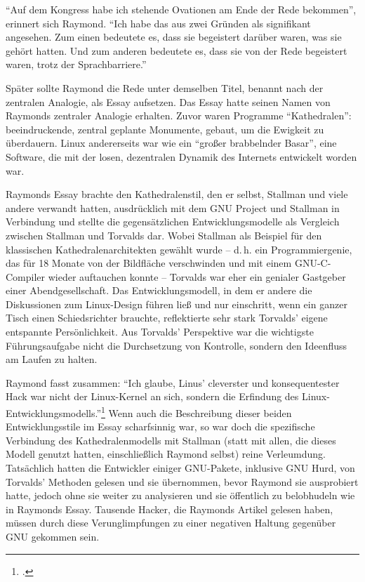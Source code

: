 "`Auf dem Kongress habe ich stehende Ovationen am Ende der Rede bekommen"', erinnert sich Raymond. "`Ich habe das aus zwei Gründen als signifikant angesehen. Zum einen bedeutete es, dass sie begeistert darüber waren, was sie gehört hatten. Und zum anderen bedeutete es, dass sie von der Rede begeistert waren, trotz der Sprachbarriere."'

Später sollte Raymond die Rede unter demselben Titel, benannt nach der zentralen Analogie, als Essay aufsetzen. Das Essay hatte seinen Namen von Raymonds zentraler Analogie erhalten. Zuvor waren Programme "`Kathedralen"': beeindruckende, zentral geplante Monumente, gebaut, um die Ewigkeit zu überdauern. Linux andererseits war wie ein "`großer brabbelnder Basar"', eine Software, die mit der losen, dezentralen Dynamik des Internets entwickelt worden war.

Raymonds Essay brachte den Kathedralenstil, den er selbst, Stallman und viele andere verwandt hatten, ausdrücklich mit dem GNU Project und Stallman in Verbindung und stellte die gegensätzlichen Entwicklungsmodelle als Vergleich zwischen Stallman und Torvalds dar. Wobei Stallman als Beispiel für den klassischen Kathedralenarchitekten gewählt wurde – d.\,h. ein Programmiergenie, das für 18 Monate von der Bildfläche verschwinden und mit einem GNU-C-Compiler wieder auftauchen konnte – Torvalds war eher ein genialer Gastgeber einer Abendgesellschaft. Das Entwicklungsmodell, in dem er andere die Diskussionen zum Linux-Design führen ließ und nur einschritt, wenn ein ganzer Tisch einen Schiedsrichter brauchte, reflektierte sehr stark Torvalds' eigene entspannte Persönlichkeit. Aus Torvalds' Perspektive war die wichtigste Führungsaufgabe nicht die Durchsetzung von Kontrolle, sondern den Ideenfluss am Laufen zu halten.

Raymond fasst zusammen: "`Ich glaube, Linus' cleverster und konsequentester Hack war nicht der Linux-Kernel an sich, sondern die Erfindung des Linux-Entwicklungsmodells."'\footcite[Vgl.][]{catb}
Wenn auch die Beschreibung dieser beiden Entwicklungsstile im Essay scharfsinnig war, so war doch die spezifische Verbindung des Kathedralenmodells mit Stallman (statt mit allen, die dieses Modell genutzt hatten, einschließlich Raymond selbst) reine Verleumdung. Tatsächlich hatten die Entwickler einiger GNU-Pakete, inklusive GNU Hurd, von Torvalds' Methoden gelesen und sie übernommen, bevor Raymond sie ausprobiert hatte, jedoch ohne sie weiter zu analysieren und sie öffentlich zu belobhudeln wie in Raymonds Essay. Tausende Hacker, die Raymonds Artikel gelesen haben, müssen durch diese Verunglimpfungen zu einer negativen Haltung gegenüber GNU gekommen sein.

